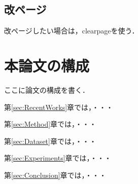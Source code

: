 \subsection{改ページ}\label{sec:改ページ}
改ページしたい場合は，clearpageを使う．
\clearpage

\section{本論文の構成}\label{sec:本論文の構成}

ここに論文の構成を書く．

第\ref{sec:RecentWorks}章では，・・・

第\ref{sec:Method}章では，・・・

第\ref{sec:Dataset}章では，・・・

第\ref{sec:Experiments}章では，・・・

第\ref{sec:Conclusion}章では，・・・


